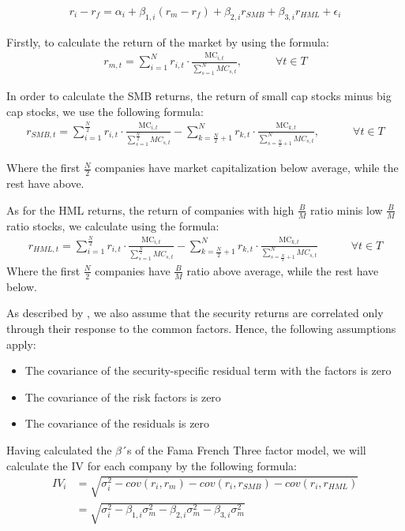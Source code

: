 \begin{align} 
    r_i - r_f= \alpha_i + \beta_{1,i}(r_m - r_f) + \beta_{2,i}r_{SMB} + \beta_{3,i}r_{HML} + \epsilon_i
\end{align}

Firstly, to calculate the return of the market by using the formula: 
\begin{align}
    r_{m,t} = \sum_{i=1}^{N} r_{i,t} \cdot \frac{\text{MC}_{i,t}}{\sum_{s=1}^{N} MC_{s,t}}, \quad \quad \quad  \forall t \in T
\end{align}

In order to calculate the SMB returns, the return of small cap stocks minus big cap stocks, we use the following formula: 
\begin{align}
    r_{SMB,t} = \sum_{i=1}^{\frac{N}{2}} r_{i,t} \cdot \frac{\text{MC}_{i,t}}{\sum_{s=1}^{\frac{N}{2}} MC_{s,t}} - \sum_{k=\frac{N}{2}+1}^{N} r_{k,t} \cdot \frac{\text{MC}_{k,t}}{\sum_{s={\frac{N}{2}+1}}^{N} MC_{s,t}}, \quad \quad \quad  \forall t \in T
\end{align}

Where the first $\frac{N}{2}$ companies have market capitalization below average, while the rest have above.

As for the HML returns, the return of companies with high $\frac{B}{M}$ ratio minis low $\frac{B}{M}$ ratio stocks, we calculate using the formula: 
\begin{align}
    r_{HML,t} = \sum_{i=1}^{\frac{N}{2}} r_{i,t} \cdot \frac{\text{MC}_{i,t}}{\sum_{s=1}^{\frac{N}{2}} MC_{s,t}} - \sum_{k=\frac{N}{2}+1}^{N} r_{k,t} \cdot \frac{\text{MC}_{k,t}}{\sum_{s=\frac{N}{2}+1}^{N} MC_{s,t}} \quad \quad \quad  \forall t \in T
\end{align}
Where the first $\frac{N}{2}$ companies have $\frac{B}{M}$ ratio above average, while the rest have below.

As described by \cite{zenios}, we also assume that the security returns are correlated only through their response to the common factors. Hence, the following assumptions apply: 
\begin{itemize}
    \item The covariance of the security-specific residual term with the factors is zero
    \item The covariance of the risk factors is zero
    \item The covariance of the residuals is zero
\end{itemize}

Having calculated the $\beta$´s of the Fama French Three factor model, we will calculate the IV for each company by the following formula:
 \begin{align}
    IV_i &= \sqrt{\sigma_i^{2} - cov(r_i,r_m) - cov(r_i,r_{SMB}) - cov(r_i,r_{HML})} \\
    &= \sqrt{\sigma_i^{2} - \beta_{1,i} \sigma_m^{2}- \beta_{2,i} \sigma_m^{2}- \beta_{3,i} \sigma_m^{2}}
\end{align}


